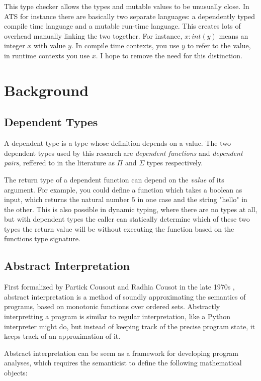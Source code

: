 \documentclass[12pt,twoside]{report}
\begin{document}
This type checker allows the types and mutable values to be unusually close. In ATS for instance there are basically two separate languages: a dependently typed compile time language and a mutable run-time language. This creates lots of overhead manually linking the two together. For instance, $x : int(y)$ means an integer $x$ with value $y$. In compile time contexts, you use $y$ to refer to the value, in runtime contexts you use $x$. I hope to remove the need for this distinction.

\chapter{Background}
\label{background}

\section{Dependent Types}
A dependent type is a type whose definition depends on a value. The two dependent types used by this research are \textit{dependent functions} and \textit{dependent pairs}, reffered to in the literature as $\Pi$ and $\Sigma$ types respectively.

The return type of a dependent function can depend on the \textit{value} of its argument. For example, you could define a function which takes a boolean as input, which returns the natural number $5$ in one case and the string $\text{"hello"}$ in the other. This is also possible in dynamic typing, where there are no types at all, but with dependent types the caller can statically determine which of these two types the return value will be without executing the function based on the functions type signature.

\section{Abstract Interpretation}
First formalized by Partick Cousout and Radhia Cousot in the late 1970s \citep{cousotAbstractInterpretationUnified1977}, abstract interpretation is a method of soundly approximating the semantics of programs, based on monotonic functions over ordered sets. Abstractly interpretting a program is similar to regular interpretation, like a Python interpreter might do, but instead of keeping track of the precise program state, it keeps track of an approximation of it.

Abstract interpretation can be seem as a framework for developing program analyses, which requires the semanticist to define the following mathematical objects:
\end{document}
